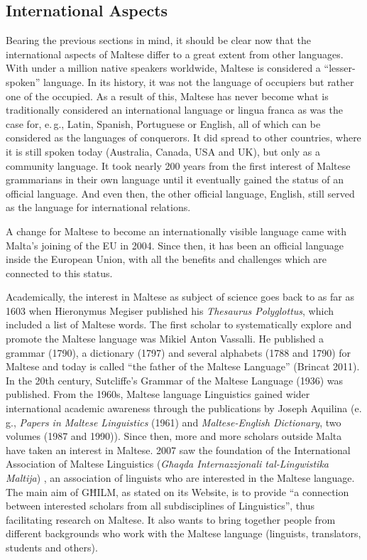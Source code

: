 \begin{multicols}{2}
\subsection{International Aspects}

Bearing the previous sections in mind, it should be clear now that the international aspects of Maltese differ to a great extent from other languages. With under a million native speakers worldwide, Maltese is considered a ``lesser-spoken'' language. In its history, it was not the language of occupiers but rather one of the occupied. As a result of this, Maltese has never become what is traditionally considered an international language or lingua franca as was the case for, e.\,g., Latin, Spanish, Portuguese or English, all of which can be considered as the languages of conquerors. It did spread to other countries, where it is still spoken today (Australia, Canada, USA and UK), but only as a community language. It took nearly 200 years from the first interest of Maltese grammarians in their own language until it eventually gained the status of an official language. And even then, the other official language, English, still served as the language for international relations. 

A change for Maltese to become an internationally visible language came with Malta's joining of the EU in 2004. Since then, it has been an official language inside the European Union, with all the benefits and challenges which are connected to this status.

Academically, the interest in Maltese as subject of science goes back to as far as 1603 when Hieronymus Megiser published his \emph{Thesaurus Polyglottus}, which included a list of Maltese words. The first scholar to systematically explore and promote the Maltese language was Mikiel Anton Vassalli. He published a grammar (1790), a dictionary (1797) and several alphabets (1788 and 1790) for Maltese and today is called ``the father of the Maltese Language'' (Brincat 2011). In the 20th century, Sutcliffe's Grammar of the Maltese Language (1936) was published. From the 1960s, Maltese language Linguistics gained wider international academic awareness through the publications by Joseph Aquilina (e.\,g., \emph{Papers in Maltese Linguistics} (1961) and \emph{Maltese-English Dictionary}, two volumes (1987 and 1990)). Since then, more and more scholars outside Malta have taken an interest in Maltese. 2007 saw the foundation of the International Association of Maltese Linguistics (\emph{Għaqda Internazzjonali tal-Lingwistika Maltija}) \cite{GHILM2}, an association of linguists who are interested in the Maltese language. The main aim of GĦILM, as stated on its Website, is to provide ``a connection between interested scholars from all subdisciplines of Linguistics'', thus facilitating research on Maltese. It also wants to bring together people from different backgrounds who work with the Maltese language (linguists, translators, students and others).



\end{multicols}
